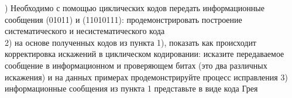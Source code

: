 ) Необходимо с помощью циклических кодов  передать  информационные сообщения (01011) и (11010111): продемонстрировать построение систематического и несистематического кода \\
2) на основе полученных кодов из пункта 1), показать как происходит корректировка искажений в циклическом кодировании: исказите передаваемое сообщение в информационном и проверяющем битах (это два различных искажения) и на данных примерах продемонстрируйте процесс исправления 
3) информационные сообщения из пункта 1 представьте в виде кода Грея
